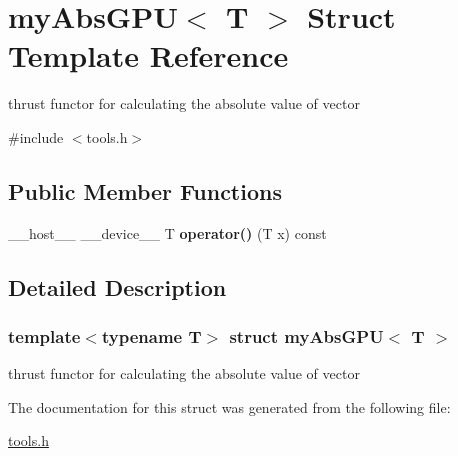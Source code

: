 \hypertarget{structmy_abs_g_p_u}{}\section{my\+Abs\+G\+PU$<$ T $>$ Struct Template Reference}
\label{structmy_abs_g_p_u}


thrust functor for calculating the absolute value of vector  




{\ttfamily \#include $<$tools.\+h$>$}

\subsection*{Public Member Functions}
\begin{DoxyCompactItemize}
\item 
\mbox{\label{structmy_abs_g_p_u_a4db26700d95cd83aef0d16ac4b09b7ba}} 
\+\_\+\+\_\+host\+\_\+\+\_\+ \+\_\+\+\_\+device\+\_\+\+\_\+ T {\bfseries operator()} (T x) const
\end{DoxyCompactItemize}


\subsection{Detailed Description}
\subsubsection*{template$<$typename T$>$\newline
struct my\+Abs\+G\+P\+U$<$ T $>$}

thrust functor for calculating the absolute value of vector 

The documentation for this struct was generated from the following file\+:\begin{DoxyCompactItemize}
\item 
\hyperlink{tools_8h}{tools.\+h}\end{DoxyCompactItemize}
